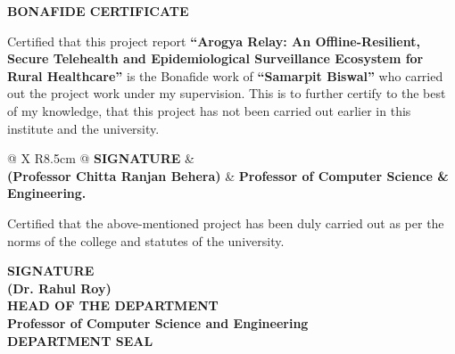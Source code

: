 \documentclass[12pt,a4paper,oneside]{report}
\begin{document}
\setcounter{page}{2}

\clearpage
{}
\thispagestyle{plain}

\begin{center}
    {\fontsize{16}{20}\selectfont \bfseries BONAFIDE CERTIFICATE}
\end{center}
\vspace{0.8cm}

{\fontsize{13}{20}\selectfont
\noindent Certified that this project report \textbf{``Arogya Relay: An Offline-Resilient, Secure Telehealth and Epidemiological Surveillance Ecosystem for Rural Healthcare''} is the Bonafide work of \textbf{``Samarpit Biswal''} who carried out the project work under my supervision. This is to further certify to the best of my knowledge, that this project has not been carried out earlier in this institute and the university.
}

\vspace{1.8cm}

\noindent
\begin{tabularx}{\textwidth}{@{} X R{8.5cm} @{}}
    \textbf{SIGNATURE} & \\[1.0cm]
    \textbf{(Professor Chitta Ranjan Behera)} & \textbf{Professor of Computer Science \& Engineering.}
\end{tabularx}

\vspace{1.8cm}

{\fontsize{13}{20}\selectfont
\noindent Certified that the above-mentioned project has been duly carried out as per the norms of the college and statutes of the university.
}

\vspace{1.5cm}

\begin{center}
    \textbf{SIGNATURE} \\[1.0cm]
    \textbf{(Dr. Rahul Roy)} \\[0.15cm]
    \textbf{HEAD OF THE DEPARTMENT} \\[0.15cm]
    \textbf{Professor of Computer Science and Engineering} \\[1.0cm]
    \textbf{DEPARTMENT SEAL}
\end{center}
\end{document}
